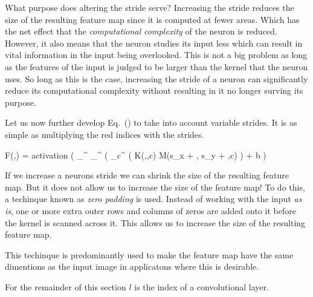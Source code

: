 What purpose does altering the stride serve?
Increasing the stride reduces the size of the resulting feature map since it is computed at fewer areas.
Which has the net effect that the {\em computational complexity} of the neuron is reduced.
However, it also means that the neuron studies its input less which can result in vital information in the input being overlooked.
This is not a big problem as long as the features of the input is judged to be larger than the kernel that the neuron uses.
So long as this is the case, increasing the stride of a neuron can significantly reduce its computational complexity without resulting in it no longer surving its purpose.

Let us now further develop Eq.~() to take into account variable strides.
It is as simple as multiplying the red indices with the strides.

\startplaceformula[reference=devel-feature-5]
\startformula
F(\color[red]{x},\color[red]{y})
=
{\rm activation}
\left( 
\sum_{\color[blue]{y}}^{}
\sum_{\color[blue]{x}}^{}
\left(
\sum_{c}^{}
\Bigl(
K(\color[blue]{x},\color[blue]{y},c)
\cdot
M(\color[red]{x}s_x + \color[blue]{x}, \color[red]{y}s_y + \color[blue]{y},c)
\right)
+
b
\right)
\stopformula
\stopplaceformula
\stopsubsubsection

\startsubsubsection[title=Zero padding]
If we increase a neurons stride we can shrink the size of the resulting feature map.
But it does not allow us to increase the size of the feature map!
To do this, a techinque known as {\em zero padding} is used.
Instead of working with the input {\em as is}, one or more extra outer rows and columns of zeros are added onto it before the kernel is scanned across it.
This allows us to increase the size of the resulting feature map.

This techinque is predominantly used to make the feature map have the same dimentions as the input image in applicatons where this is desirable.
\stopsubsubsection


For the remainder of this section $l$ is the index of a convolutional layer.

